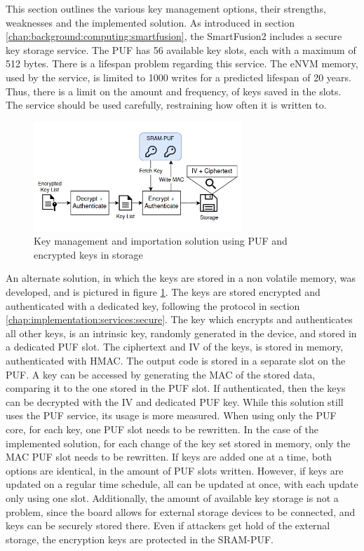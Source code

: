 This section outlines the various key management options, their strengths, weaknesses and the implemented solution. 
As introduced in section \ref{chap:background:computing:smartfusion}, the SmartFusion2 includes a secure key storage service. The PUF has 56 available key slots, each with a maximum of 512 bytes. There is a lifespan problem regarding this service. The eNVM memory, used by the service, is limited to 1000 writes for a predicted lifespan of 20 years. Thus, there is a limit on the amount and frequency, of keys saved in the slots. The service should be used carefully, restraining how often it is written to.
\begin{figure}[h!]
	\centering
	\includegraphics[width=0.7\textwidth]{./Images/key-management.png}
	\caption{Key management and importation solution using PUF and encrypted keys in storage}
	\label{fig:implementation:key-management}
\end{figure}
An alternate solution, in which the keys are stored in a non volatile memory, was developed, and is pictured in figure \ref{fig:implementation:key-management}. The keys are stored encrypted and authenticated with a dedicated key, following the protocol in section \ref{chap:implementation:services:secure}.
The key which encrypts and authenticates all other keys, is an intrinsic key, randomly generated in the device, and stored in a dedicated PUF slot. The ciphertext and IV of the keys, is stored in memory, authenticated with HMAC. The output code is stored in a separate slot on the PUF.
A key can be accessed by generating the MAC of the stored data, comparing it to the one stored in the PUF slot. If authenticated, then the keys can be decrypted with the IV and dedicated PUF key.
While this solution still uses the PUF service, its usage is more measured. When using only the PUF core, for each key, one PUF slot needs to be rewritten. In the case of the implemented solution, for each change of the key set stored in memory, only the MAC PUF slot needs to be rewritten. If keys are added one at a time, both options are identical, in the amount of PUF slots written. However, if keys are updated on a regular time schedule, all can be updated at once, with each update only using one slot. Additionally, the amount of available key storage is not a problem, since the board allows for external storage devices to be connected, and keys can be securely stored there. Even if attackers get hold of the external storage, the encryption keys are protected in the SRAM-PUF.

